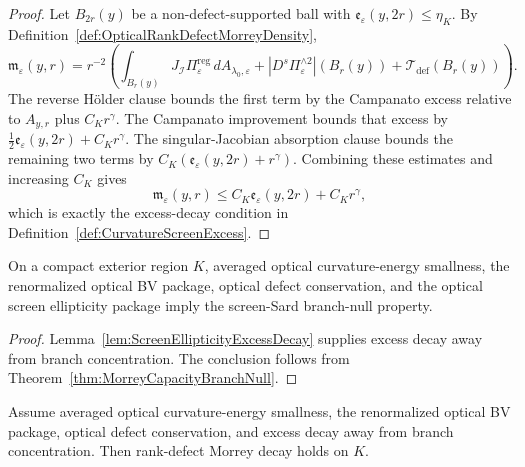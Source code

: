 \begin{proof}
Let $B_{2r}(y)$ be a non-defect-supported ball with $\mathfrak e_\varepsilon(y,2r)\le\eta_K$. By Definition~\ref{def:OpticalRankDefectMorreyDensity},
\[
    \mathfrak m_\varepsilon(y,r)
    =
    r^{-2}
    \left(
        \int_{B_r(y)}J_{\mathscr I}\Pi_\varepsilon^{\mathrm{reg}}\,dA_{\lambda_0,\varepsilon}
        +
        |D^s\Pi_\varepsilon^{\wedge 2}|(B_r(y))
        +
        \mathcal T_{\mathrm{def}}(B_r(y))
    \right).
\]
The reverse H\"older clause bounds the first term by the Campanato excess relative to $A_{y,r}$ plus $C_Kr^\gamma$. The Campanato improvement bounds that excess by $\frac12\mathfrak e_\varepsilon(y,2r)+C_Kr^\gamma$. The singular-Jacobian absorption clause bounds the remaining two terms by $C_K(\mathfrak e_\varepsilon(y,2r)+r^\gamma)$. Combining these estimates and increasing $C_K$ gives
\[
    \mathfrak m_\varepsilon(y,r)
    \le
    C_K\mathfrak e_\varepsilon(y,2r)
    +
    C_Kr^\gamma,
\]
which is exactly the excess-decay condition in Definition~\ref{def:CurvatureScreenExcess}.
\end{proof}

\begin{theorem}\label{thm:EllipticBranchNullRegularity}
On a compact exterior region $K$, averaged optical curvature-energy smallness, the renormalized optical BV package, optical defect conservation, and the optical screen ellipticity package imply the screen-Sard branch-null property.
\end{theorem}

\begin{proof}
Lemma~\ref{lem:ScreenEllipticityExcessDecay} supplies excess decay away from branch concentration. The conclusion follows from Theorem~\ref{thm:MorreyCapacityBranchNull}.
\end{proof}

\begin{lemma}\label{lem:ExcessDecayRankDefectMorrey}
Assume averaged optical curvature-energy smallness, the renormalized optical BV package, optical defect conservation, and excess decay away from branch concentration. Then rank-defect Morrey decay holds on $K$.
\end{lemma}

